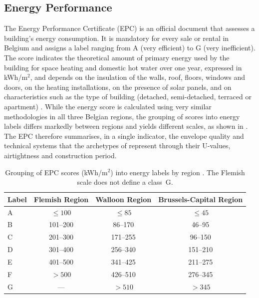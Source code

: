 \subsection{Energy Performance}
The Energy Performance Certificate (EPC) is an official document that assesses a
building's energy consumption. It is mandatory for every sale or rental in
Belgium and assigns a label ranging from A (very efficient) to G (very
inefficient). The score indicates the theoretical amount of primary energy used
by the building for space heating and domestic hot water over one year, expressed
in kWh/m$^2$, and depends on the insulation of the walls, roof, floors, windows
and doors, on the heating installations, on the presence of solar panels, and on
characteristics such as the type of building (detached, semi-detached, terraced
or apartment) \cite{nbb_epc_houseprices_2025}. While the energy score is
calculated using very similar methodologies in all three Belgian regions, the
grouping of scores into energy labels differs markedly between regions and yields
different scales, as shown in 
\cite{nbb_epc_houseprices_2025}. The EPC therefore summarises, in a single
indicator, the envelope quality and technical systems that the archetypes of
 represent through their U-values, airtightness and
construction period.

\begin{table}[ht]
  \centering
  \caption{Grouping of EPC scores (kWh/m$^2$) into energy labels by region
           \cite{nbb_epc_houseprices_2025}. The Flemish scale does not define a
           class~G.}
  \label{tab:epc_regional_scales}
  \begin{tabular}{lccc}
    \toprule
    Label & Flemish Region & Walloon Region & Brussels-Capital Region \\
    \midrule
    A & $\leq 100$   & $\leq 85$   & $\leq 45$   \\
    B & 101--200     & 86--170     & 46--95      \\
    C & 201--300     & 171--255    & 96--150     \\
    D & 301--400     & 256--340    & 151--210    \\
    E & 401--500     & 341--425    & 211--275    \\
    F & $> 500$      & 426--510    & 276--345    \\
    G & ---          & $> 510$     & $> 345$     \\
    \bottomrule
  \end{tabular}
\end{table}

